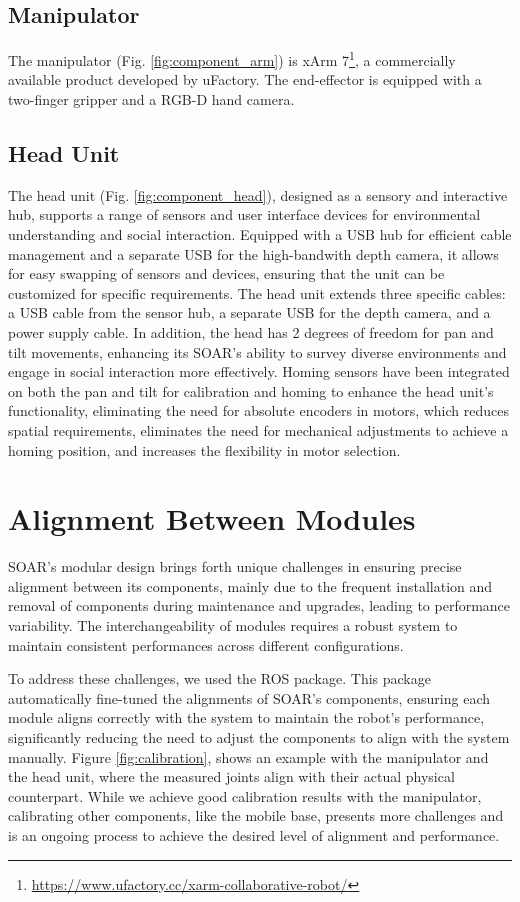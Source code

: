 \documentclass[runningheads,a4paper]{llncs}
\begin{document}
\subsection{Manipulator}
The manipulator (Fig. \ref{fig:component_arm}) is xArm 7\footnote{\url{https://www.ufactory.cc/xarm-collaborative-robot/}}, a commercially available product developed by uFactory.
The end-effector is equipped with a two-finger gripper and a RGB-D hand camera.

\subsection{Head Unit}
The head unit (Fig. \ref{fig:component_head}), designed as a sensory and interactive hub, supports a range of sensors and user interface devices for environmental understanding and social interaction.
Equipped with a USB hub for efficient cable management and a separate USB for the high-bandwith depth camera, it allows for easy swapping of sensors and devices, ensuring that the unit can be customized for specific requirements.
The head unit extends three specific cables: a USB cable from the sensor hub, a separate USB for the depth camera, and a power supply cable.
In addition, the head has 2 degrees of freedom for pan and tilt movements, enhancing its SOAR’s ability to survey diverse environments and engage in social interaction more effectively.
Homing sensors have been integrated on both the pan and tilt for calibration and homing to enhance the head unit's functionality, eliminating the need for absolute encoders in motors, which reduces spatial requirements, eliminates the need for mechanical adjustments to achieve a homing position, and increases the flexibility in motor selection.

\section{Alignment Between Modules}
SOAR's modular design brings forth unique challenges in ensuring precise alignment between its components, mainly due to the frequent installation and removal of components during maintenance and upgrades, leading to performance variability.
The interchangeability of modules requires a robust system to maintain consistent performances across different configurations.

To address these challenges, we used the \cite{ferguson2015robust} ROS package.
This package automatically fine-tuned the alignments of SOAR's components, ensuring each module aligns correctly with the system to maintain the robot's performance, significantly reducing the need to adjust the components to align with the system manually.
Figure \ref{fig:calibration}, shows an example with the manipulator and the head unit, where the measured joints align with their actual physical counterpart.
While we achieve good calibration results with the manipulator, calibrating other components, like the mobile base, presents more challenges and is an ongoing process to achieve the desired level of alignment and performance.
\end{document}
